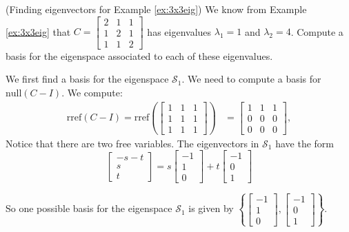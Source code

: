\documentclass{ximera}
\begin{document}
\begin{example}\label{ex:eigvectors3x3eig} (Finding eigenvectors for Example \ref{ex:3x3eig})
We know from Example \ref{ex:3x3eig} that $C=\begin{bmatrix} 2 & 1 & 1\\ 1 & 2 & 1\\ 1 & 1 & 2\end{bmatrix}$ has eigenvalues $\lambda_1=1$ and $\lambda_2=4$.  Compute a basis for the eigenspace associated to each of these eigenvalues.
\end{example}

\begin{explanation}
We first find a basis for the eigenspace $\mathcal{S}_1$.  We need to compute a basis for $\mbox{null}(C-I)$.  We compute:
\begin{align*}\mbox{rref}(C-I)=\mbox{rref}\left(\begin{bmatrix} 1 & 1 & 1\\ 1 & 1 & 1\\ 1 & 1 & 1\end{bmatrix}\right)&=\begin{bmatrix} 1 & 1 & 1\\ 0 & 0 & 0\\ 0 & 0 & 0\end{bmatrix},
\end{align*}
Notice that there are two free variables.  %
The eigenvectors in $\mathcal{S}_1$ have the form
$$\begin{bmatrix}-s-t\\s\\t\end{bmatrix} = s\begin{bmatrix}-1\\1\\0\end{bmatrix} + t\begin{bmatrix}-1\\0\\1\end{bmatrix}$$

So one possible basis for the eigenspace $\mathcal{S}_1$ is given by $\left\{\begin{bmatrix}-1\\1\\0\end{bmatrix}, \begin{bmatrix}-1\\0\\1\end{bmatrix}\right\}$.


\end{explanation}
\end{document}
